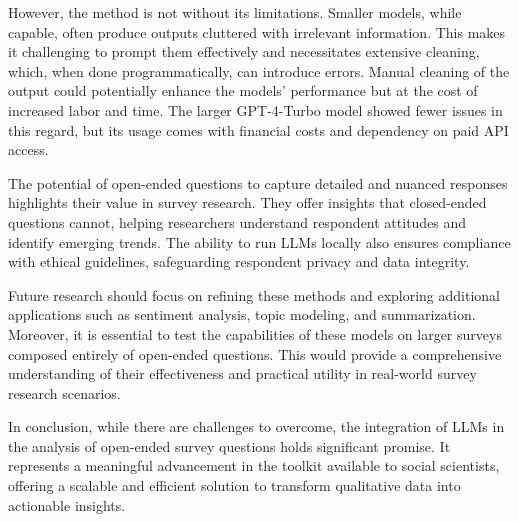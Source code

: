 \documentclass[
  authoryear,
  preprint,
  3p]{elsarticle}
\begin{document}
However, the method is not without its limitations. Smaller models,
while capable, often produce outputs cluttered with irrelevant
information. This makes it challenging to prompt them effectively and
necessitates extensive cleaning, which, when done programmatically, can
introduce errors. Manual cleaning of the output could potentially
enhance the models' performance but at the cost of increased labor and
time. The larger GPT-4-Turbo model showed fewer issues in this regard,
but its usage comes with financial costs and dependency on paid API
access.

The potential of open-ended questions to capture detailed and nuanced
responses highlights their value in survey research. They offer insights
that closed-ended questions cannot, helping researchers understand
respondent attitudes and identify emerging trends. The ability to run
LLMs locally also ensures compliance with ethical guidelines,
safeguarding respondent privacy and data integrity.

Future research should focus on refining these methods and exploring
additional applications such as sentiment analysis, topic modeling, and
summarization. Moreover, it is essential to test the capabilities of
these models on larger surveys composed entirely of open-ended
questions. This would provide a comprehensive understanding of their
effectiveness and practical utility in real-world survey research
scenarios.

In conclusion, while there are challenges to overcome, the integration
of LLMs in the analysis of open-ended survey questions holds significant
promise. It represents a meaningful advancement in the toolkit available
to social scientists, offering a scalable and efficient solution to
transform qualitative data into actionable insights.

\newpage{}


\renewcommand\refname{References}
  
\end{document}

